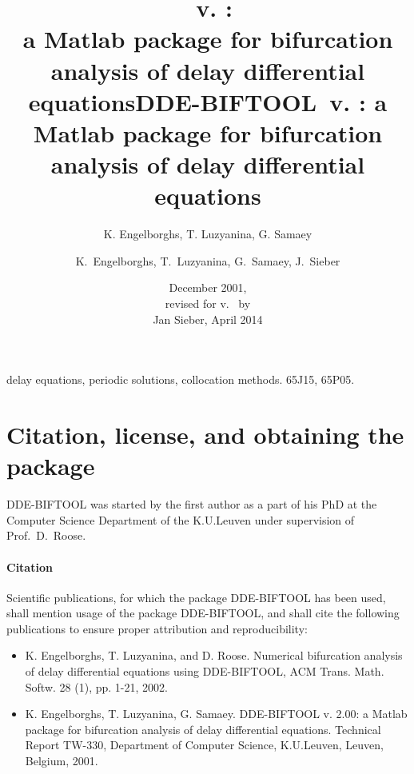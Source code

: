 \documentclass[10pt]{scrartcl}
\title{{\DDEBIFCODE\ v. \version{}}:\\
  a Matlab package  for bifurcation analysis
          of delay differential equations}
\author{K. Engelborghs, T. Luzyanina, G. Samaey}
\date{December 2001, \\[2ex]
revised for v.~\version{} by\\ Jan Sieber,  April 2014}
\newcommand{\DDEBIFCODE}{\textsc{DDE-BIFTOOL}}
\begin{document}
\begin{coverpage}

\begin{abstract}
\begin{quotation}             

\end{quotation}
\end{abstract}

\keywords delay equations, periodic solutions, collocation methods.   
\AMS \Primary 65J15,            %
     \Secondary 65P05.          %

\end{coverpage}


\title{{\DDEBIFCODE\ v. \version}: a Matlab package for bifurcation 
analysis of delay differential equations}

\author{K.~Engelborghs, T.~Luzyanina, G.~Samaey, J.~Sieber}

%
%
\renewcommand{\contentsname}{}
\tableofcontents
\clearpage
{}
\section{Citation, license, and obtaining the package}
\label{sec:app:get}
{\DDEBIFCODE} %
was started by the first author as a part of his PhD at
the Computer Science Department of the K.U.Leuven under supervision
of Prof.\ D.\ Roose.

\paragraph{Citation}
Scientific publications, for which the package DDE-BIFTOOL has been
used, shall mention usage of the package DDE-BIFTOOL, and shall cite
the following publications to ensure proper attribution and
reproducibility:
\begin{itemize}\item 
  K. Engelborghs, T. Luzyanina, and D. Roose. Numerical bifurcation
  analysis of delay differential equations using DDE-BIFTOOL, ACM
  Trans. Math. Softw. 28 (1), pp. 1-21, 2002.
\item K. Engelborghs, T. Luzyanina, G. Samaey. DDE-BIFTOOL v. 2.00: a
  Matlab package for bifurcation analysis of delay differential
  equations.  Technical Report TW-330, Department of Computer Science,
  K.U.Leuven, Leuven, Belgium, 2001.
\end{itemize}
\end{document}
